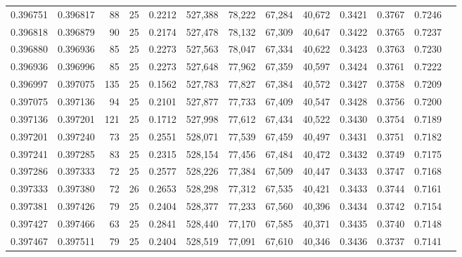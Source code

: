 \begin{tabular}{rrrrrrrrrrrrr}
0.396751 & 0.396817 &    88 &  25 &                                     0.2212 & 527,388 &  78,222 &  67,284 &  40,672 & 0.3421 & 0.3767 & 0.7246 \\
0.396818 & 0.396879 &    90 &  25 &                                     0.2174 & 527,478 &  78,132 &  67,309 &  40,647 & 0.3422 & 0.3765 & 0.7237 \\
0.396880 & 0.396936 &    85 &  25 &                                     0.2273 & 527,563 &  78,047 &  67,334 &  40,622 & 0.3423 & 0.3763 & 0.7230 \\
0.396936 & 0.396996 &    85 &  25 &                                     0.2273 & 527,648 &  77,962 &  67,359 &  40,597 & 0.3424 & 0.3761 & 0.7222 \\
0.396997 & 0.397075 &   135 &  25 &                                     0.1562 & 527,783 &  77,827 &  67,384 &  40,572 & 0.3427 & 0.3758 & 0.7209 \\
0.397075 & 0.397136 &    94 &  25 &                                     0.2101 & 527,877 &  77,733 &  67,409 &  40,547 & 0.3428 & 0.3756 & 0.7200 \\
0.397136 & 0.397201 &   121 &  25 &                                     0.1712 & 527,998 &  77,612 &  67,434 &  40,522 & 0.3430 & 0.3754 & 0.7189 \\
0.397201 & 0.397240 &    73 &  25 &                                     0.2551 & 528,071 &  77,539 &  67,459 &  40,497 & 0.3431 & 0.3751 & 0.7182 \\
0.397241 & 0.397285 &    83 &  25 &                                     0.2315 & 528,154 &  77,456 &  67,484 &  40,472 & 0.3432 & 0.3749 & 0.7175 \\
0.397286 & 0.397333 &    72 &  25 &                                     0.2577 & 528,226 &  77,384 &  67,509 &  40,447 & 0.3433 & 0.3747 & 0.7168 \\
0.397333 & 0.397380 &    72 &  26 &                                     0.2653 & 528,298 &  77,312 &  67,535 &  40,421 & 0.3433 & 0.3744 & 0.7161 \\
0.397381 & 0.397426 &    79 &  25 &                                     0.2404 & 528,377 &  77,233 &  67,560 &  40,396 & 0.3434 & 0.3742 & 0.7154 \\
0.397427 & 0.397466 &    63 &  25 &                                     0.2841 & 528,440 &  77,170 &  67,585 &  40,371 & 0.3435 & 0.3740 & 0.7148 \\
0.397467 & 0.397511 &    79 &  25 &                                     0.2404 & 528,519 &  77,091 &  67,610 &  40,346 & 0.3436 & 0.3737 & 0.7141 \\

\end{tabular}
